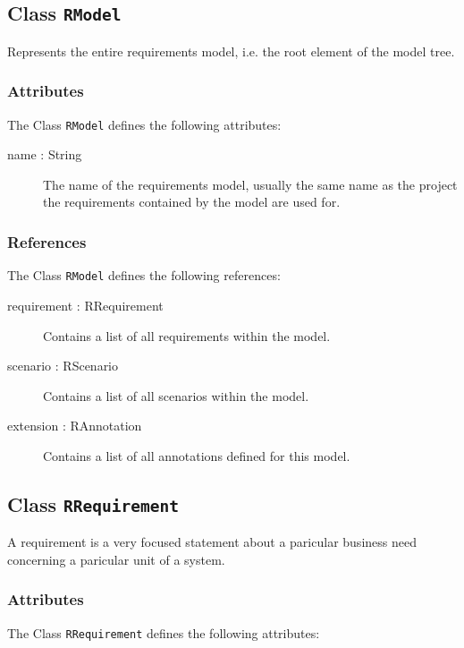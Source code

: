 
\subsection{Class {\tt RModel}}

Represents the entire requirements model, i.e. the root element of the model tree.

\subsubsection{Attributes}

The Class \verb|RModel| defines the following attributes:

\begin{description}
	\item[name : String] The name of the requirements model, usually the same name as the project the requirements contained by the model are used for.
\end{description}
\subsubsection{References}

The Class \verb|RModel| defines the following references:

\begin{description}
	\item[requirement : RRequirement] Contains a list of all requirements within the model.
	\item[scenario : RScenario] Contains a list of all scenarios within the model.
	\item[extension : RAnnotation] Contains a list of all annotations defined for this model.
\end{description}

\subsection{Class {\tt RRequirement}}

A requirement is a very focused statement about a paricular business need concerning a paricular unit of a system.

\subsubsection{Attributes}

The Class \verb|RRequirement| defines the following attributes:

